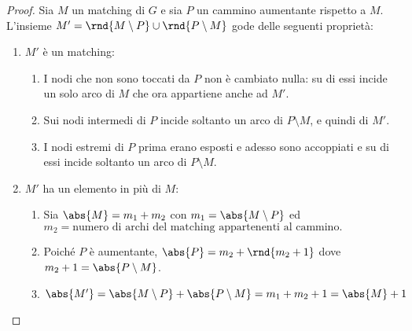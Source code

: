 \documentclass[\main/main.tex]{subfiles}
\begin{document}
\begin{proof}
	Sia \(M\) un matching di \(G\) e sia \(P\) un cammino aumentante rispetto a \(M\). L'insieme \(M' = \rnd{M\setminus P} \cup \rnd{P\setminus M}\) gode delle seguenti proprietà:
	\begin{enumerate}
		\item \(M'\) è un matching:
		      \begin{enumerate}
			      \item I nodi che non sono toccati da \(P\) non è cambiato nulla: su di essi incide un solo arco di \(M\) che ora appartiene anche ad \(M'\).
			      \item Sui nodi intermedi di \(P\) incide soltanto un arco di \(P\setminus M\), e quindi di \(M'\).
			      \item I nodi estremi di \(P\) prima erano esposti e adesso sono accoppiati e su di essi incide soltanto un arco di \(P\setminus M\).
		      \end{enumerate}
		\item \(M'\) ha un elemento in più di \(M\):
		      \begin{enumerate}
			      \item Sia \(\abs{M} = m_1 + m_2\) con \(m_1 = \abs{M \setminus P}\) ed \(m_2 = \text{numero di archi del matching appartenenti al cammino.}\)
			      \item Poiché \(P\) è aumentante, \(\abs{P} = m_2 + \rnd{m_2 + 1}\) dove \(m_2 + 1 = \abs{P\setminus M}\).
			      \item \(\abs{M'} = \abs{M \setminus P} + \abs{P \setminus M} = m_1 + m_2 + 1 = \abs{M} +1\)
		      \end{enumerate}
	\end{enumerate}
\end{proof}
\end{document}
